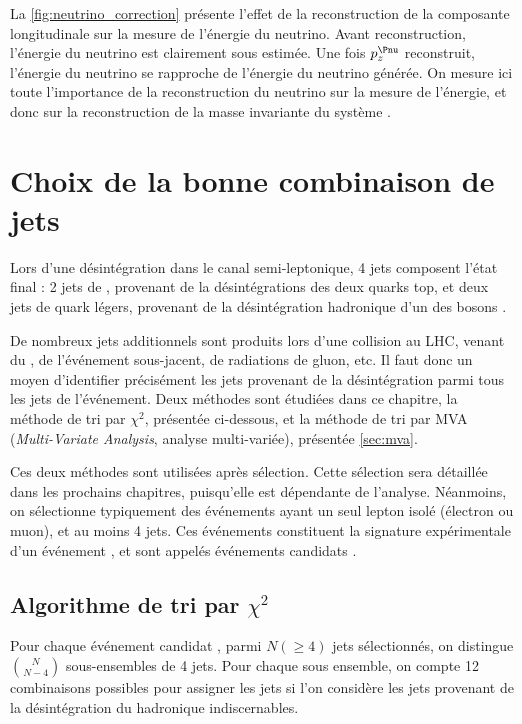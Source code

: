 \medskip

La \cref{fig:neutrino_correction} présente l'effet de la reconstruction de la composante longitudinale sur la mesure de l'énergie du neutrino. Avant reconstruction, l'énergie du neutrino est clairement sous estimée. Une fois $p_z^{\Pnu}$ reconstruit, l'énergie du neutrino se rapproche de l'énergie du neutrino générée. On mesure ici toute l'importance de la reconstruction du neutrino sur la mesure de l'énergie, et donc sur la reconstruction de la masse invariante du système \ttbar.

\section{Choix de la bonne combinaison de jets} \label{sec:chi2}

Lors d'une désintégration \ttbar dans le canal semi-leptonique, 4 jets composent l'état final : 2 jets de \Pbottom, provenant de la désintégrations des deux quarks top, et deux jets de quark légers, provenant de la désintégration hadronique d'un des bosons \PW.

De nombreux jets additionnels sont produits lors d'une collision au LHC, venant du \pu, de l'événement sous-jacent, de radiations de gluon, etc. Il faut donc un moyen d'identifier précisément les jets provenant de la désintégration \ttbar parmi tous les jets de l'événement. Deux méthodes sont étudiées dans ce chapitre, la méthode de tri par $\chi^2$, présentée ci-dessous, et la méthode de tri par MVA (\emph{Multi-Variate Analysis}, analyse multi-variée), présentée \cref{sec:mva}.

\medskip

Ces deux méthodes sont utilisées après sélection. Cette sélection sera détaillée dans les prochains chapitres, puisqu'elle est dépendante de l'analyse. Néanmoins, on sélectionne typiquement des événements ayant un seul lepton isolé (électron ou muon), et au moins 4 jets. Ces événements constituent la signature expérimentale d'un événement \ttbar, et sont appelés événements candidats \ttbar.

\subsection{Algorithme de tri par \texorpdfstring{$\chi^2$}{chi²}}

Pour chaque événement candidat \ttbar, parmi $N (\geq 4)$ jets sélectionnés, on distingue $\binom{N}{N - 4}$ sous-ensembles de 4 jets. Pour chaque sous ensemble, on compte 12 combinaisons possibles pour assigner les jets si l'on considère les jets provenant de la désintégration du \PW hadronique indiscernables.

